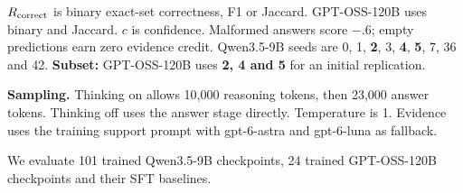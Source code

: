 \par
{\small $R_{\rm correct}$ is binary exact-set correctness, F1 or Jaccard. GPT-OSS-120B uses binary and Jaccard. $c$ is confidence. Malformed answers score $-.6$; empty predictions earn zero evidence credit. Qwen3.5-9B seeds are 0, 1, \textbf{2}, 3, \textbf{4}, \textbf{5}, 7, 36 and 42. \textbf{Subset:} GPT-OSS-120B uses \textbf{2, 4 and 5} for an initial replication.}
\par\textbf{Sampling.} Thinking on allows 10,000 reasoning tokens, then 23,000 answer tokens. Thinking off uses the answer stage directly. Temperature is 1. Evidence uses the training support prompt with gpt-6-astra and gpt-6-luna as fallback.
\par{} We evaluate 101 trained Qwen3.5-9B checkpoints, 24 trained GPT-OSS-120B checkpoints and their SFT baselines. \par\par
\endgroup

